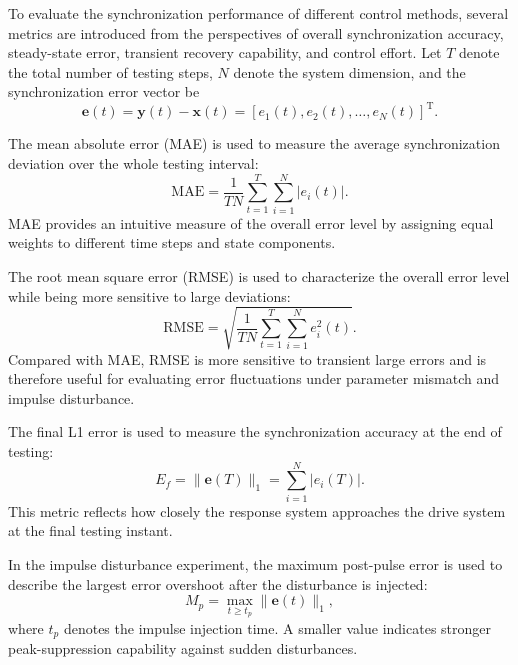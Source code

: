 \documentclass[10pt,twocolumn]{article}
\theoremstyle{definition}
\begin{document}
To evaluate the synchronization performance of different control methods, several metrics are introduced from the perspectives of overall synchronization accuracy, steady-state error, transient recovery capability, and control effort. Let $T$ denote the total number of testing steps, $N$ denote the system dimension, and the synchronization error vector be
\begin{equation}
	\mathbf{e}(t)=\mathbf{y}(t)-\mathbf{x}(t)
	=
	[e_1(t),e_2(t),\ldots,e_N(t)]^{\mathrm T}.
	\label{eq:error_vector_metrics}
\end{equation}

The mean absolute error (MAE) is used to measure the average synchronization deviation over the whole testing interval:
\begin{equation}
	\mathrm{MAE}
	=
	\frac{1}{TN}
	\sum_{t=1}^{T}
	\sum_{i=1}^{N}
	|e_i(t)|.
	\label{eq:mae}
\end{equation}
MAE provides an intuitive measure of the overall error level by assigning equal weights to different time steps and state components.

The root mean square error (RMSE) is used to characterize the overall error level while being more sensitive to large deviations:
\begin{equation}
	\mathrm{RMSE}
	=
	\sqrt{
		\frac{1}{TN}
		\sum_{t=1}^{T}
		\sum_{i=1}^{N}
		e_i^2(t)
	}.
	\label{eq:rmse}
\end{equation}
Compared with MAE, RMSE is more sensitive to transient large errors and is therefore useful for evaluating error fluctuations under parameter mismatch and impulse disturbance.

The final L1 error is used to measure the synchronization accuracy at the end of testing:
\begin{equation}
	E_f=\|\mathbf{e}(T)\|_1
	=
	\sum_{i=1}^{N}|e_i(T)|.
	\label{eq:final_l1_error}
\end{equation}
This metric reflects how closely the response system approaches the drive system at the final testing instant.

In the impulse disturbance experiment, the maximum post-pulse error is used to describe the largest error overshoot after the disturbance is injected:
\begin{equation}
	M_p=\max_{t\geq t_p}\|\mathbf{e}(t)\|_1,
	\label{eq:max_post_pulse_error}
\end{equation}
where $t_p$ denotes the impulse injection time. A smaller value indicates stronger peak-suppression capability against sudden disturbances.
\end{document}
